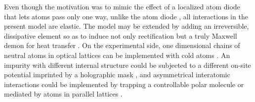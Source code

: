 Even though the motivation was to mimic the effect of a localized atom diode that lets atoms pass only one way,
unlike the atom diode \cite{Ruschhaupt2004}, all interactions in the present model
are elastic. The model may be extended by adding an irreversible,  dissipative element so as to induce not only rectification but a truly Maxwell demon for heat transfer \cite{Skordos1992,Ruschhaupt2006}.
On the experimental side, one dimensional chains of neutral atoms in optical lattices can be implemented with cold atoms \cite{Bloch2005}.
An impurity with different internal structure could be subjected to a different on-site potential imprinted by a holographic mask \cite{Bakr2009}, and asymmetrical interatomic interactions could be implemented by trapping a controllable polar molecule or mediated by atoms in parallel lattices \cite{Gollub2014}.
